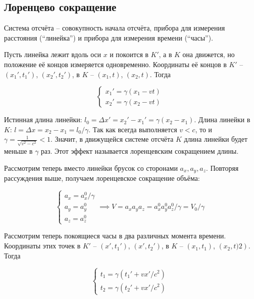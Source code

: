 \documentclass{article}
\begin{document}
\subsection{Лоренцево сокращение}

Система отсчёта -- совокупность начала отсчёта, прибора для измерения расстояния (``линейка'') и прибора для измерения времени (``часы'').

Пусть линейка лежит вдоль оси $x$ и покоится в $K'$, а в $K$ она движется, но положение её концов измеряется одновременно. Координаты её концов в $K'$ -- $\left(x_1', t_1'\right)$, $\left(x_2', t_2'\right)$, в $K$ -- $\left(x_1, t\right)$, $\left(x_2, t\right)$. Тогда

\begin{equation*}
    \begin{cases}
    x_1'=\gamma\left(x_1-vt\right)\\
    x_2'=\gamma\left(x_2-vt\right)
    \end{cases}
\end{equation*}

Истинная длина линейки: $l_0=\Delta x'=x_2'-x_1'=\gamma\left(x_2-x_1\right)$. Длина линейки в $K$: $l=\Delta x=x_2-x_1=l_0/\gamma$. Так как всегда выполняется $v <c$, то и $\gamma=\frac{1}{\sqrt{v^2-c^2}} < 1$. Значит, в движущейся системе отсчёта $K$ длина линейки будет меньше в $\gamma$ раз. Этот эффект называется лоренцевским сокращением длины.

Рассмотрим теперь вместо линейки брусок со сторонами $a_x, a_y, a_z$. Повторяя рассуждения выше, получаем лоренцевское сокращение объёма:

\begin{equation*}
    \begin{cases}
    a_x=a_x^0/\gamma\\
    a_y=a_y^0\\
    a_z=a_z^0
    \end{cases}
    \implies V=a_xa_ya_z = a_x^0a_y^0a_z^0/\gamma=V_0/\gamma
\end{equation*}

Рассмотрим теперь покоящиеся часы в два различных момента времени. Координаты этих точек в $K'$ -- $\left(x', t_1'\right)$, $\left(x', t_2'\right)$, в $K$ -- $\left(x_1, t_1\right)$, $\left(x_2, t)2\right)$. Тогда

\begin{equation*}
    \begin{cases}
    t_1=\gamma\left(t_1'+vx'/c^2\right)\\
    t_2=\gamma\left(t_2'+vx'/c^2\right)
    \end{cases}
\end{equation*}
\end{document}
